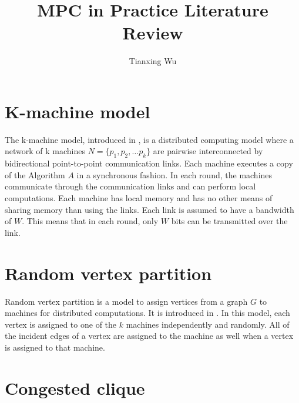 \documentclass{article}
\title{MPC in Practice Literature Review}
\author{Tianxing Wu}
\begin{document}
\maketitle

\section{K-machine model}
The k-machine model, introduced in \cite{DCLP}, is a distributed computing model where a network of k machines $N = \{p_1, p_2, \dots p_k\}$ are pairwise interconnected by bidirectional point-to-point communication links.
Each machine executes a copy of the Algorithm $A$ in a synchronous fashion. In each round, the machines communicate through the communication links and can perform local computations. Each machine has local memory and has no other means of sharing memory than using the links.
Each link is assumed to have a bandwidth of $W$. This means that in each round, only $W$ bits can be transmitted over the link.

\section{Random vertex partition}
Random vertex partition is a model to assign vertices from a graph $G$ to machines for distributed computations. It is introduced in \cite{DCLP}.
In this model, each vertex is assigned to one of the $k$ machines independently and randomly. All of the incident edges of a vertex are assigned to the machine as well when a vertex is assigned to that machine.

\section{Congested clique}

\medskip
\nocite{*}
\printbibliography
\end{document}

